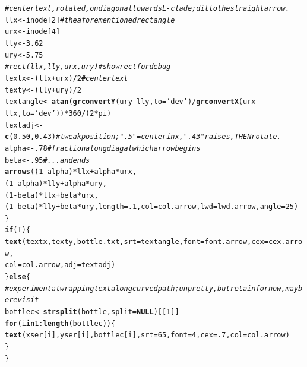 \documentclass{article}\usepackage[]{graphicx}\usepackage[]{color}
\makeatletter
\newcommand{\hlnum}[1]{\textcolor[rgb]{0.686,0.059,0.569}{#1}}%
\newcommand{\hlstr}[1]{\textcolor[rgb]{0.192,0.494,0.8}{#1}}%
\newcommand{\hlcom}[1]{\textcolor[rgb]{0.678,0.584,0.686}{\textit{#1}}}%
\newcommand{\hlopt}[1]{\textcolor[rgb]{0,0,0}{#1}}%
\newcommand{\hlstd}[1]{\textcolor[rgb]{0.345,0.345,0.345}{#1}}%
\newcommand{\hlkwa}[1]{\textcolor[rgb]{0.161,0.373,0.58}{\textbf{#1}}}%
\newcommand{\hlkwb}[1]{\textcolor[rgb]{0.69,0.353,0.396}{#1}}%
\newcommand{\hlkwc}[1]{\textcolor[rgb]{0.333,0.667,0.333}{#1}}%
\newcommand{\hlkwd}[1]{\textcolor[rgb]{0.737,0.353,0.396}{\textbf{#1}}}%
\newenvironment{kframe}{%
 \def\at@end@of@kframe{}%
 \ifinner\ifhmode%
  \def\at@end@of@kframe{\end{minipage}}%
  \begin{minipage}{\columnwidth}%
 \fi\fi%
 \def\FrameCommand##1{\hskip\@totalleftmargin \hskip-\fboxsep
 \colorbox{shadecolor}{##1}\hskip-\fboxsep
     \hskip-\linewidth \hskip-\@totalleftmargin \hskip\columnwidth}%
 \MakeFramed {\advance\hsize-\width
   \@totalleftmargin\z@ \linewidth\hsize
   \@setminipage}}%
 {\par\unskip\endMakeFramed%
 \at@end@of@kframe}
\newenvironment{knitrout}{}{} %
\makeatother
\begin{document}
\begin{knitrout}
\begin{kframe}
\begin{alltt}
    \hlcom{# center text, rotated, on diagonal towards L-clade; ditto the straight arrow.}
    \hlstd{llx} \hlkwb{<-} \hlstd{inode[}\hlnum{2}\hlstd{]} \hlcom{# the aforementioned rectangle}
    \hlstd{urx} \hlkwb{<-} \hlstd{inode[}\hlnum{4}\hlstd{]}
    \hlstd{lly} \hlkwb{<-} \hlnum{3.62}
    \hlstd{ury} \hlkwb{<-} \hlnum{5.75}
    \hlcom{# rect(llx,lly,urx,ury) # show rect for debug}
    \hlstd{textx} \hlkwb{<-} \hlstd{(llx}\hlopt{+}\hlstd{urx)}\hlopt{/}\hlnum{2}    \hlcom{# center text}
    \hlstd{texty} \hlkwb{<-} \hlstd{(lly}\hlopt{+}\hlstd{ury)}\hlopt{/}\hlnum{2}
    \hlstd{textangle} \hlkwb{<-} \hlkwd{atan}\hlstd{(}\hlkwd{grconvertY}\hlstd{(ury}\hlopt{-}\hlstd{lly,}\hlkwc{to}\hlstd{=}\hlstr{'dev'}\hlstd{)}\hlopt{/}\hlkwd{grconvertX}\hlstd{(urx}\hlopt{-}\hlstd{llx,}\hlkwc{to}\hlstd{=}\hlstr{'dev'}\hlstd{))}\hlopt{*}\hlnum{360}\hlopt{/}\hlstd{(}\hlnum{2}\hlopt{*}\hlstd{pi)}
    \hlstd{textadj} \hlkwb{<-} \hlkwd{c}\hlstd{(}\hlnum{0.50}\hlstd{,} \hlnum{0.43}\hlstd{)} \hlcom{#tweak position; ".5" = center in x , ".43" raises, THEN rotate.}
    \hlstd{alpha} \hlkwb{<-} \hlnum{.78} \hlcom{# fraction along diag at which arrow begins}
    \hlstd{beta}  \hlkwb{<-} \hlnum{.95} \hlcom{# ... and ends}
    \hlkwd{arrows}\hlstd{((}\hlnum{1}\hlopt{-}\hlstd{alpha)}\hlopt{*}\hlstd{llx} \hlopt{+} \hlstd{alpha}\hlopt{*}\hlstd{urx,}
           \hlstd{(}\hlnum{1}\hlopt{-}\hlstd{alpha)}\hlopt{*}\hlstd{lly} \hlopt{+} \hlstd{alpha}\hlopt{*}\hlstd{ury,}
           \hlstd{(}\hlnum{1}\hlopt{-}\hlstd{beta)}\hlopt{*}\hlstd{llx}  \hlopt{+} \hlstd{beta}\hlopt{*}\hlstd{urx,}
           \hlstd{(}\hlnum{1}\hlopt{-}\hlstd{beta)}\hlopt{*}\hlstd{lly}  \hlopt{+} \hlstd{beta}\hlopt{*}\hlstd{ury,} \hlkwc{length}\hlstd{=}\hlnum{.1}\hlstd{,}\hlkwc{col}\hlstd{=col.arrow,}\hlkwc{lwd}\hlstd{=lwd.arrow,}\hlkwc{angle}\hlstd{=}\hlnum{25}\hlstd{)}
  \hlstd{\}}
  \hlkwa{if}\hlstd{(T)\{}
    \hlkwd{text}\hlstd{(textx, texty, bottle.txt,} \hlkwc{srt}\hlstd{=textangle,} \hlkwc{font}\hlstd{=font.arrow,} \hlkwc{cex}\hlstd{=cex.arrow,}
         \hlkwc{col}\hlstd{=col.arrow,} \hlkwc{adj}\hlstd{=textadj)}
  \hlstd{\}} \hlkwa{else} \hlstd{\{}
    \hlcom{# experiment at wrapping text along curved path; unpretty, but retain for now, maybe revisit}
    \hlstd{bottlec} \hlkwb{<-} \hlkwd{strsplit}\hlstd{(bottle,}\hlkwc{split}\hlstd{=}\hlkwa{NULL}\hlstd{)[[}\hlnum{1}\hlstd{]]}
    \hlkwa{for}\hlstd{(i} \hlkwa{in} \hlnum{1}\hlopt{:}\hlkwd{length}\hlstd{(bottlec))\{}
      \hlkwd{text}\hlstd{(xser[i],yser[i],bottlec[i],} \hlkwc{srt}\hlstd{=}\hlnum{65}\hlstd{,} \hlkwc{font}\hlstd{=}\hlnum{4}\hlstd{,} \hlkwc{cex}\hlstd{=}\hlnum{.7}\hlstd{,} \hlkwc{col}\hlstd{=col.arrow)}
    \hlstd{\}}
  \hlstd{\}}


\end{alltt}
\end{kframe}
\end{knitrout}
\end{document}
